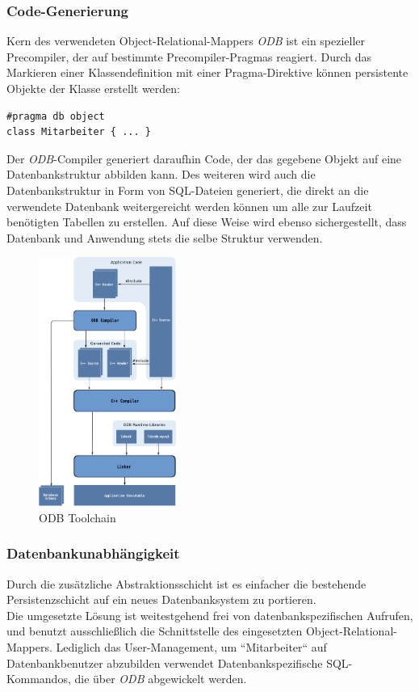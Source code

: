 \subsubsection{Code-Generierung}
Kern des verwendeten Object-Relational-Mappers \textit{ODB} ist ein spezieller Precompiler, der auf bestimmte Precompiler-Pragmas reagiert.
Durch das Markieren einer Klassendefinition mit einer Pragma-Direktive können persistente Objekte der Klasse erstellt werden:\\
\begin{lstlisting}
#pragma db object
class Mitarbeiter { ... }
\end{lstlisting}
Der \textit{ODB}-Compiler generiert daraufhin Code, der das gegebene Objekt auf eine Datenbankstruktur abbilden kann. Des weiteren wird auch die Datenbankstruktur in Form von SQL-Dateien generiert, die direkt an die verwendete Datenbank weitergereicht werden können um alle zur Laufzeit benötigten Tabellen zu erstellen. Auf diese Weise wird ebenso sichergestellt, dass Datenbank und Anwendung stets die selbe Struktur verwenden.\\
\begin{figure}[htp!]
	\begin{center}
		\includegraphics[width=0.4\textwidth]{odb-flow}
	\end{center}
	\caption{ODB Toolchain \cite{ODB_Manual}}
	\label{ODB-Flow}
\end{figure}

\newpage

\subsubsection{Datenbankunabhängigkeit}
Durch die zusätzliche Abstraktionsschicht ist es einfacher die bestehende Persistenzschicht auf ein neues Datenbanksystem zu portieren.\\
Die umgesetzte Lösung ist weitestgehend frei von datenbankspezifischen Aufrufen, und benutzt ausschließlich die Schnittstelle des eingesetzten Object-Relational-Mappers.
Lediglich das User-Management, um ``Mitarbeiter`` auf Datenbankbenutzer abzubilden verwendet Datenbankspezifische SQL-Kommandos, die über \textit{ODB} abgewickelt werden.


